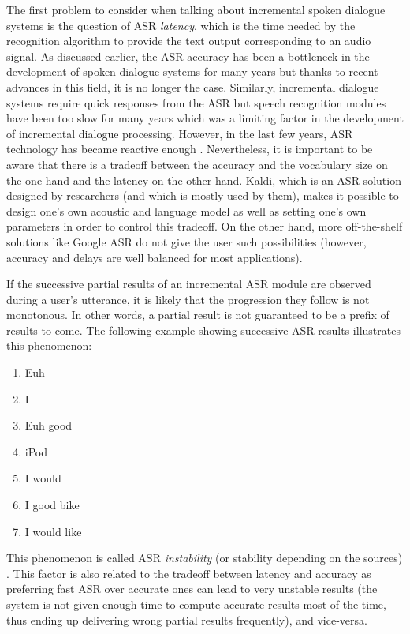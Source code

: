 		The first problem to consider when talking about incremental spoken dialogue systems is the question of ASR \textit{latency}, which is the time needed by the recognition algorithm to provide the text output corresponding to an audio signal. As discussed earlier, the ASR accuracy has been a bottleneck in the development of spoken dialogue systems for many years but thanks to recent advances in this field, it is no longer the case. Similarly, incremental dialogue systems require quick responses from the ASR but speech recognition modules have been too slow for many years which was a limiting factor in the development of incremental dialogue processing. However, in the last few years, ASR technology has became reactive enough \cite{Breslin2013,Platek2014}. Nevertheless, it is important to be aware that there is a tradeoff between the accuracy and the vocabulary size on the one hand and the latency on the other hand. Kaldi, which is an ASR solution designed by researchers (and which is mostly used by them), makes it possible to design one's own acoustic and language model as well as setting one's own parameters in order to control this tradeoff. On the other hand, more off-the-shelf solutions like Google ASR do not give the user such possibilities (however, accuracy and delays are well balanced for most applications).

		If the successive partial results of an incremental ASR module are observed during a user's utterance, it is likely that the progression they follow is not monotonous. In other words, a partial result is not guaranteed to be a prefix of results to come. The following example showing successive ASR results illustrates this phenomenon:

		\begin{enumerate}
			\item Euh
			\item I
			\item Euh good
			\item iPod
			\item I would
			\item I good bike
			\item I would like
		\end{enumerate}

		This phenomenon is called ASR \textit{instability} (or stability depending on the sources) \cite{Selfridge2011}. This factor is also related to the tradeoff between latency and accuracy as preferring fast ASR over accurate ones can lead to very unstable results (the system is not given enough time to compute accurate results most of the time, thus ending up delivering wrong partial results frequently), and vice-versa.
		
